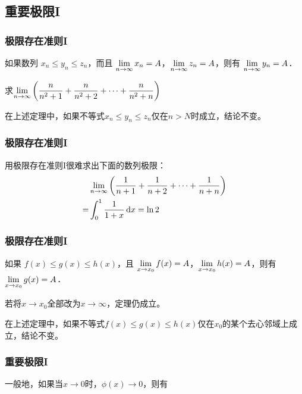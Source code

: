 \documentclass[14pt,notheorems,leqno,xcolor={rgb}]{beamer} %
\begin{document}
\subsection{重要极限I}

\begin{frame}
\frametitle{极限存在准则I}
\begin{theorem*}[极限存在准则I]%
如果数列 $x_n \le y_n \le z_n$，而且 $\lim\limits_{n\to\infty}x_n=A$，$\lim\limits_{n\to\infty}z_n=A$，则有 $\lim\limits_{n\to\infty}y_n=A$．
\end{theorem*}
\vpause
\begin{example}
求$\lim\limits_{n\to\infty}\left(\dfrac{n}{n^2+1}+\dfrac{n}{n^2+2}+\cdots+\dfrac{n}{n^2+n}\right)$
\end{example}
\vpause
\begin{remark*}
在上述定理中，如果不等式$x_n \le y_n \le z_n$仅在$n>N$时成立，结论不变。
\end{remark*}
\end{frame}

\begin{sframe}
\frametitle{极限存在准则I}
\begin{remark*}
用极限存在准则I很难求出下面的数列极限：
\begin{align*}
&\lim\limits_{n\to\infty}\left(\dfrac1{n+1}+\dfrac1{n+2}+\cdots+\dfrac1{n+n}\right)\\
=&\int_0^1\frac1{1+x}\mathop{}\!\mathrm{d}{x}=\ln2
\end{align*}
\end{remark*}
\end{sframe}

\begin{frame}
\frametitle{极限存在准则I}
\begin{theorem*}[极限存在准则I]%
如果 $f(x) \le g(x) \le h(x)$，且 $\lim\limits_{x\to x_0}f(x)=A$，$\lim\limits_{x\to x_0}h(x)=A$，则有$\lim\limits_{x\to x_0}g(x)=A$．
\end{theorem*}
\pause
\begin{remark*}
若将$x\to x_0$全部改为$x\to\infty$，定理仍成立。
\end{remark*}
\vpause
\begin{remark*}
在上述定理中，如果不等式$f(x) \le g(x) \le h(x)$仅在$x_0$的某个去心邻域上成立，结论不变。
\end{remark*}
\end{frame}

\begin{frame}
\frametitle{重要极限I}
\noindent{}
\vpause
一般地，如果当$x\to0$时，$\phi(x)\to0$，则有\par
\noindent{}
\end{frame}
\end{document}

